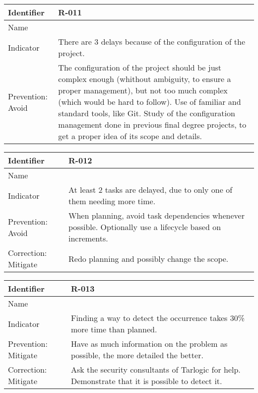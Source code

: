\begin{table}[H]
	\begin{tabularx}{\textwidth}{|y|z|}
		\hline
		Identifier & \textbf{R-011} \\ \hline
		Name & \Ronce \\ \hline
		Indicator & There are 3 delays because of the configuration of the project.\\ \hline
		Prevention: Avoid
			& The configuration of the project should be just complex enough (whithout ambiguity, to ensure a proper management), but not too much complex (which would be hard to follow). \linej
			 Use of familiar and standard tools, like Git. \linej
			 Study of the configuration management done in previous final degree projects, to get a proper idea of its scope and details.\\ \hline
	\end{tabularx}
\end{table}

\begin{table}[H]
	\begin{tabularx}{\textwidth}{|y|z|}
		\hline
		Identifier & \textbf{R-012} \\ \hline
		Name & \Rdoce \\ \hline
		Indicator & At least 2 tasks are delayed, due to only one of them needing more time.\\ \hline
		Prevention: Avoid
			& When planning, avoid task dependencies whenever possible. \linej
			 Optionally use a lifecycle based on increments.\\ \hline
		Correction: Mitigate
			& Redo planning and possibly change the scope. \\ \hline
	\end{tabularx}
\end{table}

\begin{table}[H]
	\begin{tabularx}{\textwidth}{|y|z|}
		\hline
		Identifier & \textbf{R-013} \\ \hline
		Name & \Rtrece \\ \hline
		Indicator & Finding a way to detect the occurrence takes 30\% more time than planned.\\ \hline %
		Prevention: Mitigate
			& Have as much information on the problem as possible, the more detailed the better. \\ \hline
		Correction: Mitigate
			& Ask the security consultants of Tarlogic for help. \linej
			 Demonstrate that it is possible to detect it. \\ \hline
	\end{tabularx}
\end{table}

